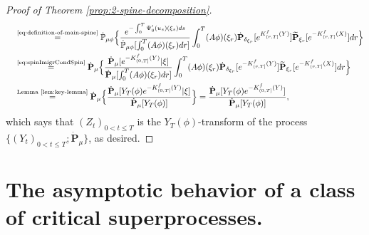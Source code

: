 \begin{proof}[Proof of Theorem \ref{prop:2-spine-decomposition}]
\[\begin{split}
	&\quad \overset{\text{\eqref{eq:definition-of-main-spine}}}{=}\dot{\mathbb P}_{\mu\phi}\Big\{ \frac{e^{-\int_0^T\Psi'_0(u_s)(\xi_s)ds}}{\dot{\mathbb P}_{\mu\phi}[\int_0^T (A\phi)(\xi_r)dr]}\int_0^T  (A\phi)(\xi_r)\dot {\mathbf P}_{\delta_{\xi_r}}[ e^{K^f_{(r, T]}(Y)}]\widetilde{\mathbf P}_{\xi_r}[e^{-K^f_{(r, T]}(X)}] dr\Big\}\\
	&\quad \overset{\text{\eqref{eq:spinImigrCondSpin}}}{=} \dot{\mathbf P}_{\mu}\Big\{ \frac{\dot {\mathbf P}_\mu[e^{-K^f_{(0,T]}(Y)}|\xi]}{\dot{\mathbf P}_{\mu}[\int_0^T (A\phi)(\xi_r)dr]}\int_0^T  (A\phi)(\xi_r)\dot {\mathbf P}_{\delta_{\xi_r}}[ e^{-K^f_{(r, T]}(Y)}]\widetilde{\mathbf P}_{\xi_r}[e^{-K^f_{(r, T]}(X)}] dr\Big\}\\
	&\quad \overset{\text{Lemma \ref{lem:key-lemma}}}{=} \dot{\mathbf P}_{\mu}\Big\{ \frac{\dot {\mathbf P}_\mu[Y_T(\phi)e^{-K^f_{(0, T]}(Y)}|\xi]}{\dot{\mathbf P}_{\mu}[Y_T(\phi)]}\Big\}=\frac{\dot {\mathbf P}_\mu[Y_T(\phi)e^{-K^f_{(0, T]}(Y)}]}{\dot{\mathbf P}_{\mu}[Y_T(\phi)]},
\end{split}\]
	which says that $(Z_t)_{0< t\leq T}$ is the $Y_T(\phi)$-transform of the process $\{(Y_t)_{0< t\leq T}; \dot {\mathbf P}_\mu\}$, as desired.
\end{proof}

\section{The asymptotic behavior of a class of critical superprocesses.}\label{sec:asymptotic}


